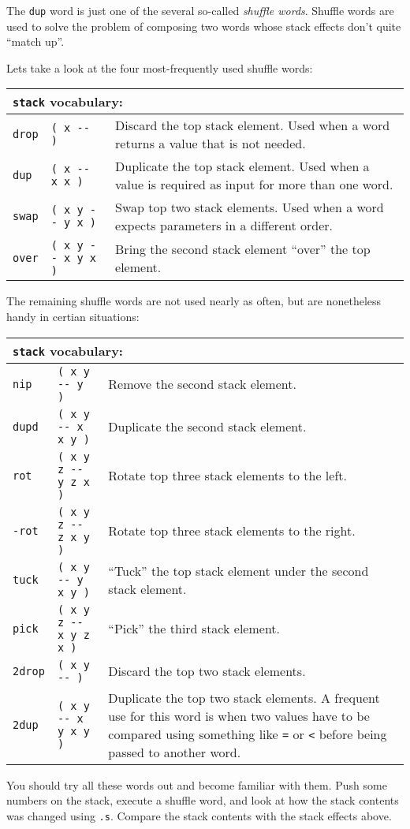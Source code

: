 \documentclass[english]{book}
\newcommand{\wordtable}[1]{{
\begin{tabularx}{12cm}{|l l X|}
#1
\hline
\end{tabularx}}}
\newcommand{\tabvocab}[1]{
\hline
\multicolumn{3}{|l|}{
\rule[-2mm]{0mm}{6mm}
\texttt{#1} vocabulary:}
\\
\hline
}
\begin{document}
The \texttt{dup} word is just one of the several so-called \emph{shuffle words}. Shuffle words are used to solve the problem of composing two words whose stack effects don't quite {}``match up''.

Lets take a look at the four most-frequently used shuffle words:

\wordtable{
\tabvocab{stack}
\texttt{drop}&
\texttt{( x -{}- )}&
Discard the top stack element. Used when
a word returns a value that is not needed.\\
\texttt{dup}&
\texttt{( x -{}- x x )}&
Duplicate the top stack element. Used
when a value is required as input for more than one word.\\
\texttt{swap}&
\texttt{( x y -{}- y x )}&
Swap top two stack elements. Used when
a word expects parameters in a different order.\\
\texttt{over}&
\texttt{( x y -{}- x y x )}&
Bring the second stack element {}``over''
the top element.\\}

The remaining shuffle words are not used nearly as often, but are nonetheless handy in certian situations:

\wordtable{
\tabvocab{stack}
\texttt{nip}&
\texttt{( x y -{}- y )}&
Remove the second stack element.\\
\texttt{dupd}&
\texttt{( x y -{}- x x y )}&
Duplicate the second stack element.\\
\texttt{rot}&
\texttt{( x y z -{}- y z x )}&
Rotate top three stack elements
to the left.\\
\texttt{-rot}&
\texttt{( x y z -{}- z x y )}&
Rotate top three stack elements
to the right.\\
\texttt{tuck}&
\texttt{( x y -{}- y x y )}&
``Tuck'' the top stack element under
the second stack element.\\
\texttt{pick}&
\texttt{( x y z -{}- x y z x )}&
``Pick'' the third stack element.\\
\texttt{2drop}&
\texttt{( x y -{}- )}&
Discard the top two stack elements.\\
\texttt{2dup}&
\texttt{( x y -{}- x y x y )}&
Duplicate the top two stack elements. A frequent use for this word is when two values have to be compared using something like \texttt{=} or \texttt{<} before being passed to another word.\\
}

You should try all these words out and become familiar with them. Push some numbers on the stack,
execute a shuffle word, and look at how the stack contents was changed using
\texttt{.s}. Compare the stack contents with the stack effects above.
\end{document}
